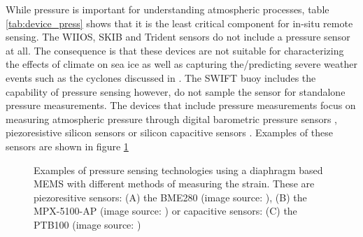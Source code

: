 While pressure is important for understanding atmospheric processes, table \ref{tab:device_press} shows that it is the least critical component for in-situ remote sensing. The WIIOS, SKIB and Trident sensors do not include a pressure sensor at all. The consequence is that these devices are not suitable for characterizing the effects of climate on sea ice as well as capturing the/predicting severe weather events such as the cyclones discussed in \textcite{vichi2019effects}. The SWIFT buoy includes the capability of pressure sensing however, do not sample the sensor for standalone pressure measurements. The devices that include pressure measurements focus on measuring atmospheric pressure through digital barometric pressure sensors \cite{rabault2019open,planck2019evolution}, piezoresistive silicon sensors \cite{doble2017robust} or silicon capacitive sensors \cite{uptempo}. Examples of these sensors are shown in figure \ref{fig:press_examples} 

\begin{figure}[H]
	\centering
	\begin{subfigure}[b]{0.3\textwidth}
	\end{subfigure}%
	\hfill
	\begin{subfigure}[b]{0.3\textwidth}
	\end{subfigure}%
	\hfill
	\begin{subfigure}[b]{0.3\textwidth}
	\end{subfigure}%
	\hfill
	\caption{Examples of pressure sensing technologies using a diaphragm based MEMS with different methods of measuring the strain. These are piezoresitive sensors: (A) the BME280 (image source: \cite{BME280}), (B) the MPX-5100-AP (image source: \cite{MPX5100AP}) or  capacitive sensors: (C) the PTB100 (image source: \cite{PTB110})  } 
	\label{fig:press_examples}
\end{figure}


